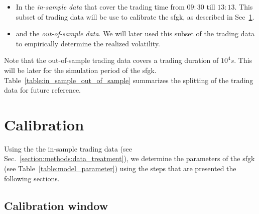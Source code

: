 \documentclass[11pt, a4paper]{thesis}  %
\begin{document}
\begin{itemize}
	\item In the {\it in-sample data} that cover the trading time from $09:30$ till  $13:13$. 
	This subset of trading data will be use to calibrate the \ac{sfgk}, 
	as described in Sec~\ref{section:methods:calibration}.
	
	\item and the {\it out-of-sample data}. We will later used this subset of the trading data to empirically determine the realized volatility.
\end{itemize}

\noindent Note that the out-of-sample trading data covers a trading duration of $10^4s$. This will be later for the simulation period of the \ac{sfgk}. Table~\ref{table:in_sample_out_of_sample} summarizes the splitting of the trading data for future reference.


\section{Calibration}
\label{section:methods:calibration}


Using the the in-sample trading data (see Sec.~\ref{section:methods:data_treatment}), we determine the parameters of the \ac{sfgk} (see Table~\ref{table:model_parameter}) using the steps that are presented the following sections.


\subsection{Calibration window}
\end{document}
